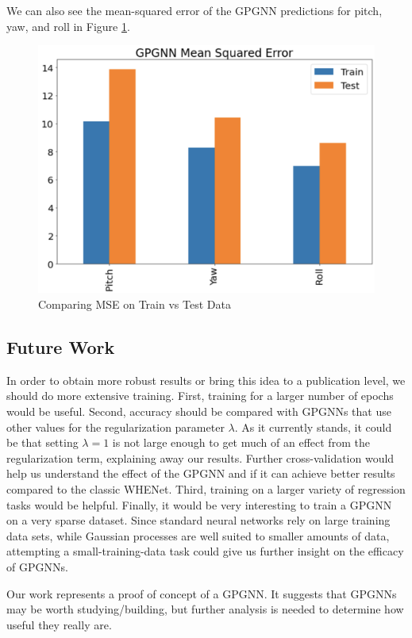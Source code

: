 \documentclass[11pt,letterpaper]{article}
\begin{document}
We can also see the mean-squared error of the GPGNN predictions for pitch, yaw, and roll in Figure \ref{mse_fig}.

\begin{figure}[!htb]
\begin{center}
   \includegraphics[width=0.55\linewidth]{./pics/mse_p_y_r.png}
   \caption{Comparing MSE on Train vs Test Data}
   \label{mse_fig}
\end{center}
\end{figure}

\subsection{Future Work}
In order to obtain more robust results or bring this idea to a publication level, we should do more extensive training.
First, training for a larger number of epochs would be useful.
Second, accuracy should be compared with GPGNNs that use other values for the regularization parameter $\lambda$.
As it currently stands, it could be that setting $ \lambda = 1 $ is not large enough to get much of an effect from the regularization term, explaining away our results.
Further cross-validation would help us understand the effect of the GPGNN and if it can achieve better results compared to the classic WHENet.
Third, training on a larger variety of regression tasks would be helpful.
Finally, it would be very interesting to train a GPGNN on a very sparse dataset.
Since standard neural networks rely on large training data sets, while Gaussian processes are well suited to smaller amounts of data, attempting a small-training-data task could give us further insight on the efficacy of GPGNNs.

Our work represents a proof of concept of a GPGNN.
It suggests that GPGNNs may be worth studying/building, but further analysis is needed to determine how useful they really are.


{}

\end{document}
